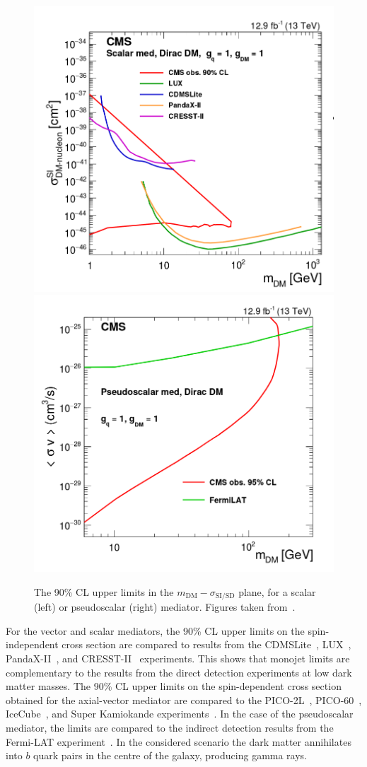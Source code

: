 \begin{figure}[ht]
  \centering
 \includegraphics[width=.49\textwidth]{scalar_DD.png} 
 \includegraphics[width=.49\textwidth]{pseudoscalar_DD.png} 
 \caption{The 90\% CL upper limits in the  $m_{\mathrm{DM}}-\sigma_{\mathrm{SI/SD}}$ plane, for a scalar (left) or pseudoscalar (right) mediator. Figures taken from~\cite{Sirunyan:2017hci}.}
 \label{fig:DDlimits_2}
\end{figure}

For the vector and scalar mediators, the 90\% CL upper limits on the spin-independent cross section are compared to results from the CDMSLite~\cite{Agnese:2015nto}, LUX~\cite{Akerib:2015rjg}, PandaX-II~\cite{Tan:2016zwf}, and CRESST-II~\cite{Angloher:2015ewa} experiments. This shows that monojet limits are complementary to the results from the direct detection experiments at low dark matter masses. The 90\% CL upper limits on the spin-dependent cross section obtained for the axial-vector mediator are compared to the PICO-2L~\cite{Amole:2016pye}, PICO-60~\cite{Amole:2015pla}, IceCube~\cite{Aartsen:2016exj}, and Super Kamiokande experiments~\cite{Choi:2015ara}. In the case of the pseudoscalar mediator, the limits are compared to the indirect detection results from the Fermi-LAT experiment~\cite{Ackermann:2011wa,Abdo:2010ex}. In the considered scenario the dark matter annihilates into $b$ quark pairs in the centre of the galaxy, producing gamma rays.

\clearpage{\pagestyle{empty}\cleardoublepage}
